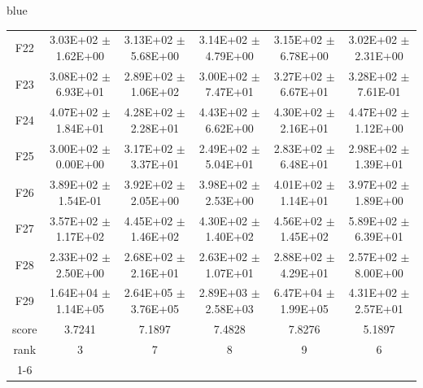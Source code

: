 \documentclass[journal, onecolumn]{IEEEtran}
\begin{document}
\begin{color}{blue}
\begin{table}[htbp!]
\begin{tabular}{c|ccccc}
			F22	 &	3.03E+02	$\pm$	1.62E+00		 &	3.13E+02	$\pm$	5.68E+00		 &	3.14E+02	$\pm$	4.79E+00		 &	3.15E+02	$\pm$	6.78E+00		 &	3.02E+02	$\pm$	2.31E+00	\\	
			F23	 &	3.08E+02	$\pm$	6.93E+01		 &	2.89E+02	$\pm$	1.06E+02		 &	3.00E+02	$\pm$	7.47E+01		 &	3.27E+02	$\pm$	6.67E+01		 &	3.28E+02	$\pm$	7.61E-01	\\	
			F24	 &	4.07E+02	$\pm$	1.84E+01		 &	4.28E+02	$\pm$	2.28E+01		 &	4.43E+02	$\pm$	6.62E+00		 &	4.30E+02	$\pm$	2.16E+01		 &	4.47E+02	$\pm$	1.12E+00	\\	
			F25	 &	3.00E+02	$\pm$	0.00E+00		 &	3.17E+02	$\pm$	3.37E+01		 &	2.49E+02	$\pm$	5.04E+01		 &	2.83E+02	$\pm$	6.48E+01		 &	2.98E+02	$\pm$	1.39E+01	\\	
			F26	 &	3.89E+02	$\pm$	1.54E-01		 &	3.92E+02	$\pm$	2.05E+00		 &	3.98E+02	$\pm$	2.53E+00		 &	4.01E+02	$\pm$	1.14E+01		 &	3.97E+02	$\pm$	1.89E+00	\\	
			F27	 &	3.57E+02	$\pm$	1.17E+02		 &	4.45E+02	$\pm$	1.46E+02		 &	4.30E+02	$\pm$	1.40E+02		 &	4.56E+02	$\pm$	1.45E+02		 &	5.89E+02	$\pm$	6.39E+01	\\	
			F28	 &	2.33E+02	$\pm$	2.50E+00		 &	2.68E+02	$\pm$	2.16E+01		 &	2.63E+02	$\pm$	1.07E+01		 &	2.88E+02	$\pm$	4.29E+01		 &	2.57E+02	$\pm$	8.00E+00	\\	
			F29	 &	1.64E+04	$\pm$	1.14E+05		 &	2.64E+05	$\pm$	3.76E+05		 &	2.89E+03	$\pm$	2.58E+03		 &	6.47E+04	$\pm$	1.99E+05		 &	4.31E+02	$\pm$	2.57E+01	\\	\hline
			score	 	& 3.7241 & 7.1897 & 7.4828 & 7.8276 & 5.1897											\\										
			rank 		& 3 & 7 & 8 & 9 & 6											\\	\cline{1-6}												
			
	\end{tabular}
\end{table}


\end{color}
\end{document}

